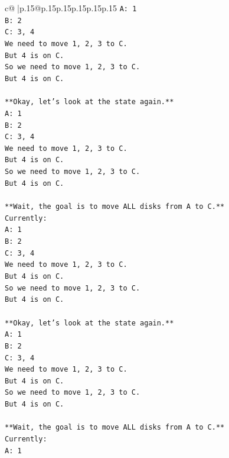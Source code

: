 \documentclass{article}
\begin{document}
{\begin{supertabular}{c@{$\;$}|p{.15\linewidth}@{}p{.15\linewidth}p{.15\linewidth}p{.15\linewidth}p{.15\linewidth}p{.15\linewidth}}
{{{\texttt{A: 1} \\
\texttt{B: 2} \\
\texttt{C: 3, 4} \\
\texttt{We need to move 1, 2, 3 to C.} \\
\texttt{But 4 is on C.} \\
\texttt{So we need to move 1, 2, 3 to C.} \\
\texttt{But 4 is on C.} \\
\\ 
\texttt{**Okay, let's look at the state again.**} \\
\texttt{A: 1} \\
\texttt{B: 2} \\
\texttt{C: 3, 4} \\
\texttt{We need to move 1, 2, 3 to C.} \\
\texttt{But 4 is on C.} \\
\texttt{So we need to move 1, 2, 3 to C.} \\
\texttt{But 4 is on C.} \\
\\ 
\texttt{**Wait, the goal is to move ALL disks from A to C.**} \\
\texttt{Currently:} \\
\texttt{A: 1} \\
\texttt{B: 2} \\
\texttt{C: 3, 4} \\
\texttt{We need to move 1, 2, 3 to C.} \\
\texttt{But 4 is on C.} \\
\texttt{So we need to move 1, 2, 3 to C.} \\
\texttt{But 4 is on C.} \\
\\ 
\texttt{**Okay, let's look at the state again.**} \\
\texttt{A: 1} \\
\texttt{B: 2} \\
\texttt{C: 3, 4} \\
\texttt{We need to move 1, 2, 3 to C.} \\
\texttt{But 4 is on C.} \\
\texttt{So we need to move 1, 2, 3 to C.} \\
\texttt{But 4 is on C.} \\
\\ 
\texttt{**Wait, the goal is to move ALL disks from A to C.**} \\
\texttt{Currently:} \\
\texttt{A: 1} \\
}}}
\end{supertabular}}
\end{document}
